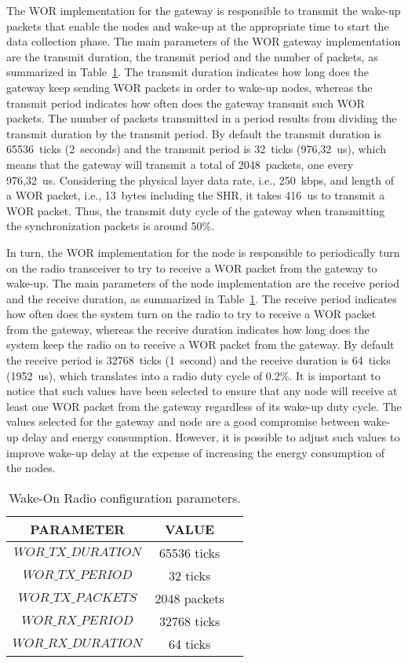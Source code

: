 The WOR implementation for the gateway is responsible to transmit the wake-up packets that enable the nodes and wake-up at the appropriate time to start the data collection phase. The main parameters of the WOR gateway implementation are the transmit duration, the transmit period and the number of packets, as summarized in Table~\ref{tab:06-wor}. The transmit duration indicates how long does the gateway keep sending WOR packets in order to wake-up nodes, whereas the transmit period indicates how often does the gateway transmit such WOR packets. The number of packets transmitted in a period results from dividing the transmit duration by the transmit period. By default the transmit duration is 65536~ticks (2~seconds) and the transmit period is 32~ticks (976,32~us), which means that the gateway will transmit a total of 2048~packets, one every 976,32~us. Considering the physical layer data rate, i.e., 250~kbps, and length of a WOR packet, i.e., 13~bytes including the SHR, it takes 416~us to transmit a WOR packet. Thus, the transmit duty cycle of the gateway when transmitting the synchronization packets is around 50\%.

In turn, the WOR implementation for the node is responsible to periodically turn on the radio transceiver to try to receive a WOR packet from the gateway to wake-up. The main parameters of the node implementation are the receive period and the receive duration, as summarized in Table~\ref{tab:06-wor}. The receive period indicates how often does the system turn on the radio to try to receive a WOR packet from the gateway, whereas the receive duration indicates how long does the system keep the radio on to receive a WOR packet from the gateway. By default the receive period is 32768~ticks (1~second) and the receive duration is 64~ticks (1952~us), which translates into a radio duty cycle of 0.2\%. It is important to notice that such values have been selected to ensure that any node will receive at least one WOR packet from the gateway regardless of its wake-up duty cycle. The values selected for the gateway and node are a good compromise between wake-up delay and energy consumption. However, it is possible to adjust such values to improve wake-up delay at the expense of increasing the energy consumption of the nodes.

\begin{table}[!it]
\centering
\begin{tabular}{|c|c|c|}
\hline
\textbf{PARAMETER} & \textbf{VALUE} \\ \hline
$WOR\_TX\_DURATION$  & 65536 ticks    \\ \hline
$WOR\_TX\_PERIOD$    & 32 ticks       \\ \hline
$WOR\_TX\_PACKETS$   & 2048 packets   \\ \hline
$WOR\_RX\_PERIOD$    & 32768 ticks    \\ \hline
$WOR\_RX\_DURATION$  & 64 ticks       \\
\hline
\end{tabular}
\label{tab:06-wor}
\caption{Wake-On Radio configuration parameters.}
\end{table}

